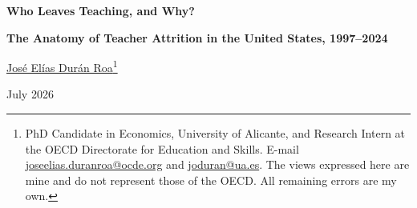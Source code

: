 \documentclass[11pt,a4paper]{article}
\begin{document}
\begin{center}
{\fontsize{20}{26}\selectfont\bfseries
Who Leaves Teaching, and Why?\par}
\vspace{8pt}
{\fontsize{15}{20}\selectfont\bfseries
The Anatomy of Teacher Attrition in the United States, 1997--2024\par}

\vspace{26pt}
{\large \href{https://sites.google.com/view/joseeliasduranroa}{José Elías Durán Roa}\footnote{PhD Candidate in Economics,
University of Alicante, and Research Intern at the OECD Directorate for
Education and Skills. E-mail\,
\href{mailto:joseelias.duranroa@ocde.org}{joseelias.duranroa@ocde.org} and
\href{mailto:joduran@ua.es}{joduran@ua.es}. The views expressed here are
mine and do not represent those of the OECD. All remaining errors are my
own.}}

\vspace{8pt}
{\small July 2026}
\end{center}
\end{document}
